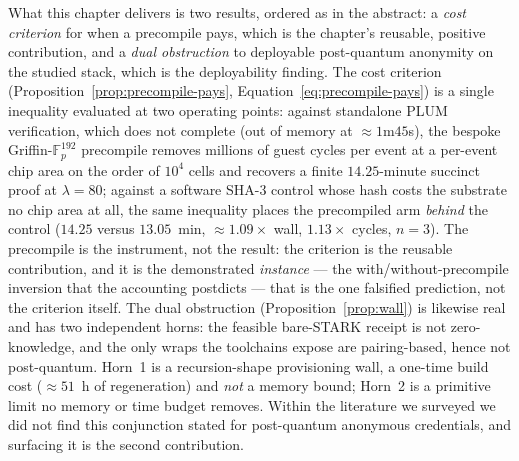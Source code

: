 What this chapter delivers is two results, ordered as in the abstract: a \emph{cost criterion} for when
a precompile pays, which is the chapter's reusable, positive contribution, and a \emph{dual obstruction}
to deployable post-quantum anonymity on the studied stack, which is the deployability finding. The cost
criterion (Proposition~\ref{prop:precompile-pays}, Equation~\eqref{eq:precompile-pays}) is a single
inequality evaluated at two operating points: against standalone PLUM verification, which does not
complete (out of memory at ${\approx}1$m$45$s), the bespoke Griffin-$\mathbb{F}_p^{192}$ precompile
removes millions of guest cycles per event at a per-event chip area on the order of $10^{4}$ cells and
recovers a finite $14.25$-minute succinct proof at $\lambda=80$; against a software SHA-3 control whose
hash costs the substrate no chip area at all, the same inequality places the precompiled arm
\emph{behind} the control ($14.25$ versus $13.05$~min, ${\approx}1.09\times$ wall, $1.13\times$ cycles,
$n{=}3$). The precompile is the instrument, not the result: the criterion is the reusable contribution,
and it is the demonstrated \emph{instance} --- the with/without-precompile inversion that the accounting
postdicts --- that is the one falsified prediction, not the criterion itself. The dual obstruction
(Proposition~\ref{prop:wall}) is likewise real and has two independent horns: the feasible bare-STARK
receipt is not zero-knowledge, and the only wraps the toolchains expose are pairing-based, hence not
post-quantum. Horn~1 is a recursion-shape provisioning wall, a one-time build cost (${\approx}51$~h of
regeneration) and \emph{not} a memory bound; Horn~2 is a primitive limit no memory or time budget
removes. Within the literature we surveyed we did not find this conjunction stated for post-quantum
anonymous credentials, and surfacing it is the second contribution.

